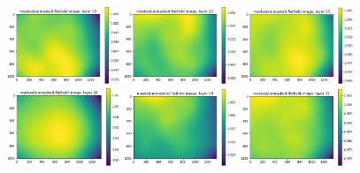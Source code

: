 \documentclass[letterpaper,11pt]{article}
\begin{document}
\begin{figure}[!ht]
\includegraphics[width=0.3\textwidth]{images/results/masked_over_unmasked_flatfield_image_layers/masked_over_unmasked_flatfield_image_layer_19}
\includegraphics[width=0.3\textwidth]{images/results/masked_over_unmasked_flatfield_image_layers/masked_over_unmasked_flatfield_image_layer_22}
\includegraphics[width=0.3\textwidth]{images/results/masked_over_unmasked_flatfield_image_layers/masked_over_unmasked_flatfield_image_layer_25}
\includegraphics[width=0.3\textwidth]{images/results/masked_over_unmasked_flatfield_image_layers/masked_over_unmasked_flatfield_image_layer_26}
\includegraphics[width=0.3\textwidth]{images/results/masked_over_unmasked_flatfield_image_layers/masked_over_unmasked_flatfield_image_layer_29}
\includegraphics[width=0.3\textwidth]{images/results/masked_over_unmasked_flatfield_image_layers/masked_over_unmasked_flatfield_image_layer_32}

\end{figure}
\end{document}
